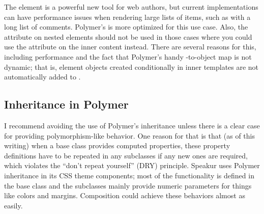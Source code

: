 The  element is a powerful new tool for web authors, 
but current implementations can have performance issues when rendering large lists of items, such as with a long list of comments. 
Polymer's  is more optimized for this use case.
Also, the  attribute on nested  elements should not be used in those cases where you could use the  attribute on the inner content instead.
There are several reasons for this, including performance and 
the fact that Polymer's handy  -to-object map is not dynamic; 
that is, element objects created conditionally in inner templates are not automatically added to .

\subsection{Inheritance in Polymer}
I recommend avoiding the use of Polymer's inheritance unless there is a clear case for providing polymorphism-like behavior.
One reason for that is that (as of this writing) when a base class provides computed properties, 
these property definitions have to be repeated in any subclasses if any new ones are required,
which violates the ``don't repeat yourself'' (DRY) principle.
Speakur uses Polymer inheritance in its CSS theme components; 
most of the functionality is defined in the base class and the subclasses mainly provide numeric parameters for things like colors and margins.
Composition could achieve these behaviors almost as easily.


